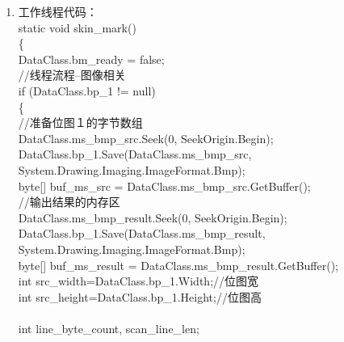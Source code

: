 ﻿\documentclass[12pt,a4paper,oneside]{book}
\begin{document}
\begin{enumerate}
\hspace*{2em}\}\\
\item 工作线程代码： \\
\hspace*{0em}static void skin\_mark()\\
\hspace*{0em}\{\\
\hspace*{2em}DataClass.bm\_ready = false;\\
\hspace*{2em}//线程流程--图像相关\\
\hspace*{2em}if (DataClass.bp\_1 != null)\\
\hspace*{2em}\{ \\
\hspace*{4em}//准备位图１的字节数组\\
\hspace*{4em}DataClass.ms\_bmp\_src.Seek(0, SeekOrigin.Begin);\\
\hspace*{4em}DataClass.bp\_1.Save(DataClass.ms\_bmp\_src, System.Drawing.Imaging.ImageFormat.Bmp);\\
\hspace*{4em}byte[] buf\_ms\_src = DataClass.ms\_bmp\_src.GetBuffer();\\
\hspace*{4em}//输出结果的内存区\\
\hspace*{4em}DataClass.ms\_bmp\_result.Seek(0, SeekOrigin.Begin);\\
\hspace*{4em}DataClass.bp\_1.Save(DataClass.ms\_bmp\_result, System.Drawing.Imaging.ImageFormat.Bmp);\\
\hspace*{4em}byte[] buf\_ms\_result = DataClass.ms\_bmp\_result.GetBuffer();\\
\hspace*{4em}int src\_width=DataClass.bp\_1.Width;//位图宽\\
\hspace*{4em}int src\_height=DataClass.bp\_1.Height;//位图高\\
\hspace*{4em}\\
\hspace*{4em}int line\_byte\_count, scan\_line\_len;\\

\end{enumerate}
\end{document}
